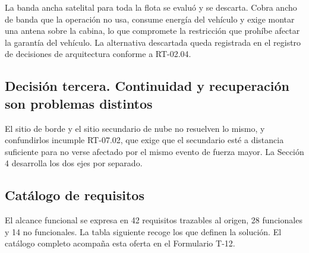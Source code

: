 La banda ancha satelital para toda la flota se evaluó y se descarta. Cobra ancho de banda que la
operación no usa, consume energía del vehículo y exige montar una antena sobre la cabina, lo que
compromete la restricción que prohíbe afectar la garantía del vehículo. La alternativa descartada
queda registrada en el registro de decisiones de arquitectura conforme a RT-02.04.

\subsection{Decisión tercera. Continuidad y recuperación son problemas distintos}

El sitio de borde y el sitio secundario de nube no resuelven lo mismo, y confundirlos incumple
RT-07.02, que exige que el secundario esté a distancia suficiente para no verse afectado por el
mismo evento de fuerza mayor. La Sección 4 desarrolla los dos ejes por separado.

\subsection{Catálogo de requisitos}

El alcance funcional se expresa en 42 requisitos trazables al origen, 28 funcionales y 14 no
funcionales. La tabla siguiente recoge los que definen la solución. El catálogo completo acompaña
esta oferta en el Formulario T-12.

